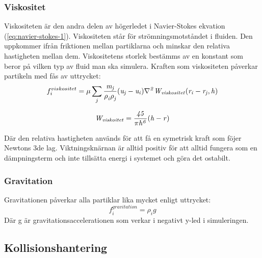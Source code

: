 \documentclass[a4paper,12pt,oneside,final]{extarticle}
\begin{document}
\subsubsection{Viskositet}
Viskositeten är den andra delen av högerledet i Navier-Stokes ekvation (\ref{eq:navier-stokes-1}).
Viskositeten står för strömningsmotståndet i fluiden.
Den uppkommer ifrån friktionen mellan partiklarna och minskar den relativa hastigheten mellan dem.
Viskositetens storlek bestämms av en konstant som beror på vilken typ av fluid man ska simulera.
Kraften som viskositeten påverkar partikeln med fås av uttrycket:
\begin{equation}
f^{viskositet}_i = \mu \sum_{j} {\it \frac{m_j}{\rho^{}_{i} \rho^{}_{j}} (u_j - u_i) \nabla^{2}_{} W_{viskositet} (r_i - r_j,h)}
\end{equation}

\begin{equation}
{\it W_{viskoitet} = \frac{45}{\pi h^6} {(h-r)}}
\end{equation}

Där den relativa hastigheten används för att få en symetrisk kraft som föjer Newtons 3de lag. Viktningsknärnan är alltid positiv för att alltid fungera som en dämpningsterm och inte tillsätta energi i systemet och göra det ostabilt. 

\subsubsection{Gravitation}
Gravitationen påverkar alla partiklar lika mycket enligt uttrycket:
\begin{equation}
f^{gravitation}_{i} = \rho^{}_{i}g
\end{equation}
Där g är gravitationsaccelerationen som verkar i negativt y-led i simuleringen.

\subsection{Kollisionshantering}
\end{document}
